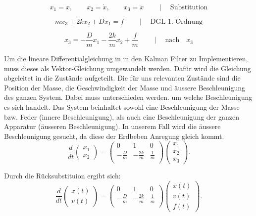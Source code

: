 \documentclass[11pt,a4paper]{article}
\begin{document}
\begin{equation}
{x_1}=x, \qquad
{x_2}=\dot x,  \qquad
{x_3}=\ddot x\qquad \mid \quad \text {Substitution}
\end{equation}


\begin{equation}
m{x_3}+ 2k{x_2} + D{x_1} = f\qquad \mid \quad \text {DGL 1. Ordnung}
\end{equation} 

\begin{equation}
{x_3}=-\frac{D}{m} {x_1} -\frac{2k}{m} {x_2} + \frac{f} {m}  \qquad \mid \quad \text {nach}  \quad{x_3} 
\end{equation} 

Um die lineare Differentialgleichung in in den Kalman Filter zu Implementieren, muss dieses als Vektor-Gleichung umgewandelt werden. Dafür wird die Gleichung abgeleitet in die Zustände aufgeteilt. Die für uns relevanten Zustände sind die Position der Masse, die Geschwindigkeit der Masse und äussere Beschleunigung des ganzen System. Dabei muss unterschieden werden. um welche Beschleunigung es sich handelt. Das System beinhaltet sowohl eine Beschleunigung der Masse bzw. Feder (innere Beschleunigung), als auch eine Beschleunigung der ganzen Apparatur (äusseren Beschleunigung). In unserem Fall wird die äussere Beschleunigung gesucht, da diese der Erdbeben Anregung gleich kommt. 
\begin{equation}
\frac{d}{dt} \left(\begin{array}{c} {x_1} \\ {x_2}  \end{array}\right) = \left(
 \begin{array}{ccc} 	
0 & 1& 0 \\ 
- \frac{D}{m} &-\frac{2k}{m} & \frac{1} {m}\\
\end{array}\right)  \left(\begin{array}{c} {x_1} \\ {x_2} \\ {x_3} \end{array}\right).
\end{equation}

Durch die Rücksubstituion ergibt sich:
\begin{equation}
\frac{d}{dt} \left(\begin{array}{c} x(t) \\ v(t) \end{array}\right) = \left(
 \begin{array}{ccc} 	
0 & 1& 0 \\ 
- \frac{D}{m} &-\frac{2k}{m} & \frac{1} {m}\\
\end{array}\right)  \left(\begin{array}{c} x(t)\\ v(t)\\ f(t) \end{array}\right).
\end{equation}
\end{document}
